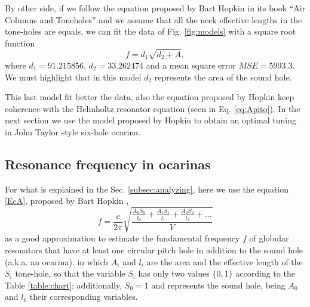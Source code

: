 \documentclass[11pt,twocolumn]{article}
\begin{document}
By other side, 
if we follow the equation proposed by Bart Hopkin in its book ``Air Columns and Toneholes'' 
\cite[pp. 44]{cabreraestudio} \cite[pp. 16]{1999air} and we assume that all the neck effective lengths in the tone-holes are equals,
we can fit the data of Fig. \ref{fig:models} with a square root function
\begin{equation}
f=d_1\sqrt{d_2+A},
\end{equation}
where $d_1=91.215856$, $d_2=33.262474$ and a mean square error $MSE=5993.3$.
We must highlight that in this model $d_2$ represents the area of the sound hole. 

This last model fit better the data, 
also the equation proposed by Hopkin keep coherence with the Helmholtz resonator equation (seen in Eq. \ref{eq:Apito}).
In the next section we use the model proposed by Hopkin to obtain an optimal tuning in 
John Taylor style six-hole ocarina.


\subsection{Resonance frequency in ocarinas}
\label{subsec:Resonance}
For what is explained in the Sec. \ref{subsec:analyzing}, here 
we use the equation \ref{EcA}, proposed by Bart Hopkin \cite[pp. 44]{cabreraestudio} \cite[pp. 16]{1999air},
\begin{equation} \label{EcA}
 f = \frac{c}{2 \pi} \sqrt{\frac{\frac{A_{0}S_{0}}{l_{0}}+\frac{A_{1}S_{1}}{l_{1}}+\frac{A_{2}S_{2}}{l_{2}}+ . . .}{V} }   
\end{equation}
as a good approximation to estimate the fundamental frequency $f$ 
of globular resonators that have at least one circular pitch hole in addition to the sound hole (a.k.a. an ocarina). 
in which $A_i$ and $l_i$ are the area and the effective length of the $S_i$ tone-hole, 
so that the variable $S_i$ has only two values $\{0,1\}$ according to the Table \ref{table:chart}; 
additionally, $S_0=1$ and represents the sound hole, being $A_0$ and $l_0$ their corresponding variables. 
\end{document}
